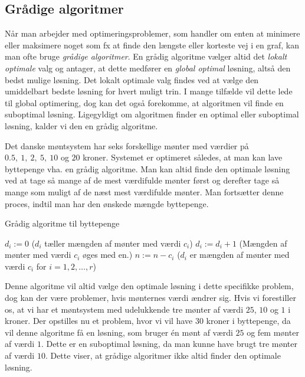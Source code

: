 \subsection{Grådige algoritmer}
Når man arbejder med optimeringsproblemer, som handler om enten at minimere eller maksimere noget som fx at finde den længste eller korteste vej i en graf, kan man ofte bruge \emph{grådige algoritmer}.
En grådig algoritme vælger altid det \emph{lokalt optimale} valg og antager, at dette medfører en \emph{global optimal} løsning, altså den bedst mulige løsning. Det lokalt optimale valg findes ved at vælge den umiddelbart bedste løsning for hvert muligt trin.
I mange tilfælde vil dette lede til global optimering, dog kan det også forekomme, at algoritmen vil finde en suboptimal løsning. Ligegyldigt om algoritmen finder en optimal eller suboptimal løsning, kalder vi den en grådig algoritme.

\begin{exmp}
Det danske møntsystem har seks forskellige mønter med værdier på $0.5,\ 1,\ 2,\ 5,\ 10$ og $20$ kroner. Systemet er optimeret således, at man kan lave byttepenge vha. en grådig algoritme. Man kan altid finde den optimale løsning ved at tage så mange af de mest værdifulde mønter først og derefter tage så mange som muligt af de næst mest værdifulde mønter. Man fortsætter denne proces, indtil man har den ønskede mængde byttepenge.
\begin{algorithm} [H]
\caption{Grådig algoritme til byttepenge}
\begin{algorithmic}[1]

\EndProcedure
{}
    \State $d_i:=0$ ($d_i$ tæller mængden af mønter med værdi $c_i$)
    	\State $d_i := d_i+1$ (Mængden af mønter med værdi $c_i$ øges med en.)
    	\State $n := n-c_i$
\EndWhile
\EndFor
\State ($d_i$ er mængden af mønter med værdi $c_i$ for $i=1,2,\dotsc,r$)
\end{algorithmic}
\end{algorithm}
Denne algoritme vil altid vælge den optimale løsning i dette specifikke problem, dog kan der være problemer, hvis mønternes værdi ændrer sig. 
Hvis vi forestiller os, at vi har et møntsystem med udelukkende tre mønter af værdi $25$, $10$ og $1$ i kroner. Der opstilles nu et problem, hvor vi vil have $30$ kroner i byttepenge, da vil denne algoritme få en løsning, som bruger én mønt af værdi $25$ og fem mønter af værdi $1$. Dette er en suboptimal løsning, da man kunne have brugt tre mønter af værdi $10$.
Dette viser, at grådige algoritmer ikke altid finder den optimale løsning.
\end{exmp}

